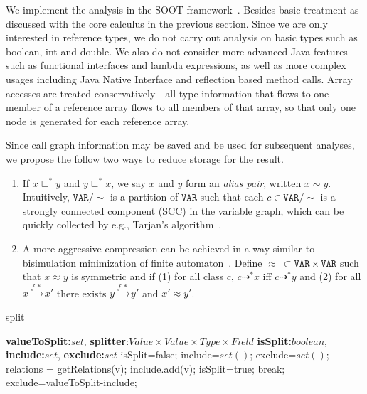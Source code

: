 \documentclass{llncs}
\newcommand\Var{\mathtt{VAR}}
\newcommand{\less}{\sqsubseteq}
\newcommand{\tflow}{\dashrightarrow}
\newcommand{\hflow}{\longrightarrow}
\newcommand{\lhflow}[1]{\stackrel{#1}{\hflow}}
\begin{document}
We implement the analysis in the SOOT framework~\cite{soot}. Besides basic treatment as discussed with the core calculus in the previous section. Since we are only interested in reference types, we do not carry out analysis on basic types such as \textsf{boolean}, \textsf{int} and \textsf{double}. We also do not consider more advanced Java features such as functional interfaces and lambda expressions, as well as more complex usages including Java Native Interface and reflection based method calls.
Array accesses are treated conservatively---all type information that flows to one member of a reference array flows to all members of that array, so that only one node is generated for each reference array.

Since call graph information may be saved and be used for subsequent analyses, we propose the follow two ways to reduce storage for the result.
\begin{enumerate}
  \item If $x\less^*y$ and $y\less^*x$, we say $x$ and $y$ form an \emph{alias pair}, written $x\sim y$. Intuitively, $\Var/\sim$ is a partition of $\Var$ such that each $c\in\Var/\sim$ is a strongly connected component (SCC) in the variable graph, which can be quickly collected by e.g., Tarjan's algorithm~\cite{Tarjan72}.
  \item A more aggressive compression can be achieved in a way similar to bisimulation minimization of finite automaton~\cite{Kanellakis90,Paige87}. Define $\approx\ \subset\Var\times\Var$ such that $x\approx y$ is symmetric and if (1) for all class $c$, $c\tflow^* x$ iff $c\tflow^*y$ and (2) for all $x\lhflow{f\ *}x'$ there exists $y\lhflow{f\ *}y'$ and $x'\approx y'$.
\end{enumerate}



\begin{algorithm}
\caption{split}
\label{alg:split}
\begin{algorithmic}
\REQUIRE \textbf{valueToSplit:}$set$, \textbf{splitter}:$Value \times Value \times Type \times Field$
\ENSURE \textbf{isSplit:}$boolean$, \textbf{include:}$set$, \textbf{exclude:}$set$
\STATE isSplit=false;
\STATE include=$set()$;
\STATE exclude=$set()$;
\STATE relations = getRelations(v);		
\STATE include.add(v);
\STATE isSplit=true;
\STATE break;
\ENDIF
\ENDFOR
\ENDFOR
{}
	\STATE exclude=valueToSplit-include;
\ENDIF

\end{algorithmic}
\end{algorithm}
\end{document}

